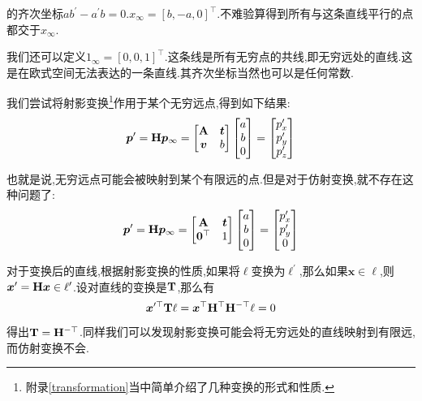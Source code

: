 的齐次坐标$ab^\prime - a^\prime b = 0$.$x_\infty = [b, -a, 0]^\top$.不难验算得到所有与这条直线平行的点都交于$x_\infty$.

我们还可以定义$1_\infty = [0, 0, 1]^\top$.这条线是所有无穷点的共线,即无穷远处的直线.这是在欧式空间无法表达的一条直线.其齐次坐标当然也可以是任何常数.

我们尝试将射影变换\footnote{附录\ref{transformation}当中简单介绍了几种变换的形式和性质.}作用于某个无穷远点,得到如下结果:
\begin{equation}
	\bm p^{\prime}=\bold{H} \bm p_{\infty}=\begin{bmatrix}
		\bold{A} & \bm t \\
		\bm v  & b
	\end{bmatrix}
	\begin{bmatrix}
		a \\
		b \\
		0
	\end{bmatrix}=
	\begin{bmatrix}
		p_{x}^{\prime} \\
		p_{y}^{\prime} \\
		p_{z}^{\prime}
	\end{bmatrix}
\end{equation}

也就是说,无穷远点可能会被映射到某个有限远的点.但是对于仿射变换,就不存在这种问题了:
\begin{equation}
	\bm p^{\prime}=\bold{H} \bm p_{\infty}=\begin{bmatrix}
		\bold{A} & \bm t \\
		\bm 0^\top & 1
	\end{bmatrix}
	\begin{bmatrix}
		a \\
		b \\
		0
	\end{bmatrix}=
	\begin{bmatrix}
		p_{x}^{\prime} \\
		p_{y}^{\prime} \\
		0
	\end{bmatrix}
\end{equation}

对于变换后的直线,根据射影变换的性质,如果将$\ell$变换为$\ell^\prime$,那么如果$\bm x \in \ell$,则$\bm x^\prime = \bold{H} \bm x \in \ell^\prime$.设对直线的变换是$\bold{T}$,那么有
\begin{equation}
	\bm x^{\prime \top} \bold{T} \ell=\bm x^{\top} \bold{H}^{\top} \bold{H}^{-\top} \ell=0
\end{equation}
得出$\bold{T} = \bold{H}^{-\top}$.同样我们可以发现射影变换可能会将无穷远处的直线映射到有限远,而仿射变换不会.

